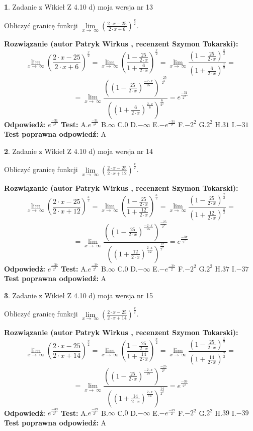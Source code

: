\documentclass[12pt, a4paper]{article}
\theoremstyle{definition} %
\newtheorem{zad}{}
\newcommand{\zadStart}[1]{\begin{zad}#1\newline}
\newcommand{\zadStop}{\end{zad}}
\newcommand{\rozwStart}[2]{\noindent \textbf{Rozwiązanie (autor #1 , recenzent #2): }\newline}
\newcommand{\rozwStop}{\newline}
\newcommand{\odpStart}{\noindent \textbf{Odpowiedź:}\newline}
\newcommand{\odpStop}{\newline}
\newcommand{\testStart}{\noindent \textbf{Test:}\newline}
\newcommand{\testStop}{\newline}
\newcommand{\kluczStart}{\noindent \textbf{Test poprawna odpowiedź:}\newline}
\newcommand{\kluczStop}{\newline}
\begin{document}
\zadStart{Zadanie z Wikieł Z 4.10 d) moja wersja nr 13}


Obliczyć granicę funkcji  $\lim\limits_{x\to\ \infty}(\frac{2\cdot x-25}{2\cdot x+6})^{\frac{x}{2}}$.
\zadStop
\rozwStart{Patryk Wirkus}{Szymon Tokarski}
$$\lim\limits_{x\to\ \infty}(\frac{2\cdot x-25}{2\cdot x+6})^{\frac{x}{2}} = \lim\limits_{x\to\ \infty}(\frac{1-\frac{25}{2\cdot x}}{1+\frac{6}{2\cdot x}})^{\frac{x}{2}}=\lim\limits_{x\to\ \infty}\frac{(1-\frac{25}{2\cdot x})^{\frac{x}{2}}}{(1+\frac{6}{2\cdot x})^{\frac{x}{2}}}=$$
$$=\lim\limits_{x\to\ \infty}\frac{((1-\frac{25}{2\cdot x})^{\frac{-2\cdot x}{25}})^{\frac{-25}{2^{2}}}}{((1+\frac{6}{2\cdot x})^{\frac{2\cdot x}{6}})^{\frac{6}{2^{2}}}}=e^{\frac{-31}{2^{2}}}$$
\rozwStop
\odpStart
$e^{\frac{-31}{2^{2}}}$
\odpStop
\testStart
A.$e^{\frac{-31}{2^{2}}}$ B.$\infty$ C.$0$ D.$-\infty$ E.$-e^{\frac{-31}{2}}$
F.$-2^{2}$ G.$2^{2}$
H.$31$
I.$-31$
\testStop
\kluczStart
A
\kluczStop



\zadStart{Zadanie z Wikieł Z 4.10 d) moja wersja nr 14}


Obliczyć granicę funkcji  $\lim\limits_{x\to\ \infty}(\frac{2\cdot x-25}{2\cdot x+12})^{\frac{x}{2}}$.
\zadStop
\rozwStart{Patryk Wirkus}{Szymon Tokarski}
$$\lim\limits_{x\to\ \infty}(\frac{2\cdot x-25}{2\cdot x+12})^{\frac{x}{2}} = \lim\limits_{x\to\ \infty}(\frac{1-\frac{25}{2\cdot x}}{1+\frac{12}{2\cdot x}})^{\frac{x}{2}}=\lim\limits_{x\to\ \infty}\frac{(1-\frac{25}{2\cdot x})^{\frac{x}{2}}}{(1+\frac{12}{2\cdot x})^{\frac{x}{2}}}=$$
$$=\lim\limits_{x\to\ \infty}\frac{((1-\frac{25}{2\cdot x})^{\frac{-2\cdot x}{25}})^{\frac{-25}{2^{2}}}}{((1+\frac{12}{2\cdot x})^{\frac{2\cdot x}{12}})^{\frac{12}{2^{2}}}}=e^{\frac{-37}{2^{2}}}$$
\rozwStop
\odpStart
$e^{\frac{-37}{2^{2}}}$
\odpStop
\testStart
A.$e^{\frac{-37}{2^{2}}}$ B.$\infty$ C.$0$ D.$-\infty$ E.$-e^{\frac{-37}{2}}$
F.$-2^{2}$ G.$2^{2}$
H.$37$
I.$-37$
\testStop
\kluczStart
A
\kluczStop



\zadStart{Zadanie z Wikieł Z 4.10 d) moja wersja nr 15}


Obliczyć granicę funkcji  $\lim\limits_{x\to\ \infty}(\frac{2\cdot x-25}{2\cdot x+14})^{\frac{x}{2}}$.
\zadStop
\rozwStart{Patryk Wirkus}{Szymon Tokarski}
$$\lim\limits_{x\to\ \infty}(\frac{2\cdot x-25}{2\cdot x+14})^{\frac{x}{2}} = \lim\limits_{x\to\ \infty}(\frac{1-\frac{25}{2\cdot x}}{1+\frac{14}{2\cdot x}})^{\frac{x}{2}}=\lim\limits_{x\to\ \infty}\frac{(1-\frac{25}{2\cdot x})^{\frac{x}{2}}}{(1+\frac{14}{2\cdot x})^{\frac{x}{2}}}=$$
$$=\lim\limits_{x\to\ \infty}\frac{((1-\frac{25}{2\cdot x})^{\frac{-2\cdot x}{25}})^{\frac{-25}{2^{2}}}}{((1+\frac{14}{2\cdot x})^{\frac{2\cdot x}{14}})^{\frac{14}{2^{2}}}}=e^{\frac{-39}{2^{2}}}$$
\rozwStop
\odpStart
$e^{\frac{-39}{2^{2}}}$
\odpStop
\testStart
A.$e^{\frac{-39}{2^{2}}}$ B.$\infty$ C.$0$ D.$-\infty$ E.$-e^{\frac{-39}{2}}$
F.$-2^{2}$ G.$2^{2}$
H.$39$
I.$-39$
\testStop
\kluczStart
A
\kluczStop
\end{document}
